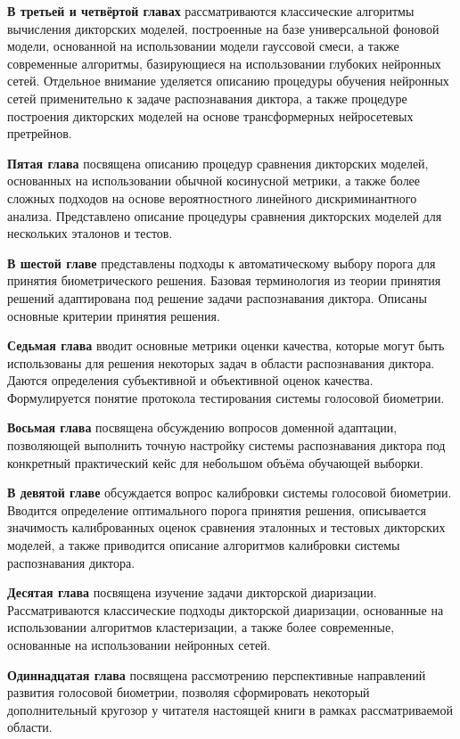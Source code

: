 \documentclass[12pt]{book}
\begin{document}
\textbf{В третьей и четвёртой главах} рассматриваются классические алгоритмы вычисления дикторских моделей, построенные на базе универсальной фоновой модели, основанной на использовании модели гауссовой смеси, а также современные алгоритмы, базирующиеся на использовании глубоких нейронных сетей. Отдельное внимание уделяется описанию процедуры обучения нейронных сетей применительно к задаче распознавания диктора, а также процедуре построения дикторских моделей на основе трансформерных нейросетевых претрейнов.

\textbf{Пятая глава} посвящена описанию процедур сравнения дикторских моделей, основанных на использовании обычной косинусной метрики, а также более сложных подходов на основе вероятностного линейного дискриминантного анализа. Представлено описание процедуры сравнения дикторских моделей для нескольких эталонов и тестов.

\textbf{В шестой главе} представлены подходы к автоматическому выбору порога для принятия биометрического решения. Базовая терминология из теории принятия решений адаптирована под решение задачи распознавания диктора. Описаны основные критерии принятия решения.

\textbf{Седьмая глава} вводит основные метрики оценки качества, которые могут быть использованы для решения некоторых задач в области распознавания диктора. Даются определения субъективной и объективной оценок качества. Формулируется понятие протокола тестирования системы голосовой биометрии.

\textbf{Восьмая глава} посвящена обсуждению вопросов доменной адаптации, позволяющей выполнить точную настройку системы распознавания диктора под конкретный практический кейс для небольшом объёма обучающей выборки.

\textbf{В девятой главе} обсуждается вопрос калибровки системы голосовой биометрии. Вводится определение оптимального порога принятия решения, описывается значимость калиброванных оценок сравнения эталонных и тестовых дикторских моделей, а также приводится описание алгоритмов калибровки системы распознавания диктора.

\textbf{Десятая глава} посвящена изучение задачи дикторской диаризации. Рассматриваются классические подходы дикторской диаризации, основанные на использовании алгоритмов кластеризации, а также более современные, основанные на использовании нейронных сетей.

\textbf{Одиннадцатая глава} посвящена рассмотрению перспективные направлений развития голосовой биометрии, позволяя сформировать некоторый дополнительный кругозор у читателя настоящей книги в рамках рассматриваемой области.
\end{document}
